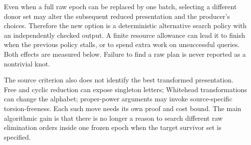 Even when a full raw epoch can be replaced by one batch, selecting a
different donor set may alter the subsequent reduced presentation and
the producer's choices. Therefore the new option is a deterministic
alternative search policy with an independently checked output. A finite
resource allowance can lead it to finish when the previous policy stalls,
or to spend extra work on unsuccessful queries. Both effects are measured
below. Failure to find a raw plan is never reported as a nontrivial knot.

The source criterion also does not identify the best transformed
presentation. Free and cyclic reduction can expose singleton letters;
Whitehead transformations can change the alphabet; proper-power
arguments may invoke source-specific torsion-freeness. Each such move
needs its own proof and cost bound. The main algorithmic gain is that
there is no longer a reason to search different raw elimination orders
inside one frozen epoch when the target survivor set is specified.
